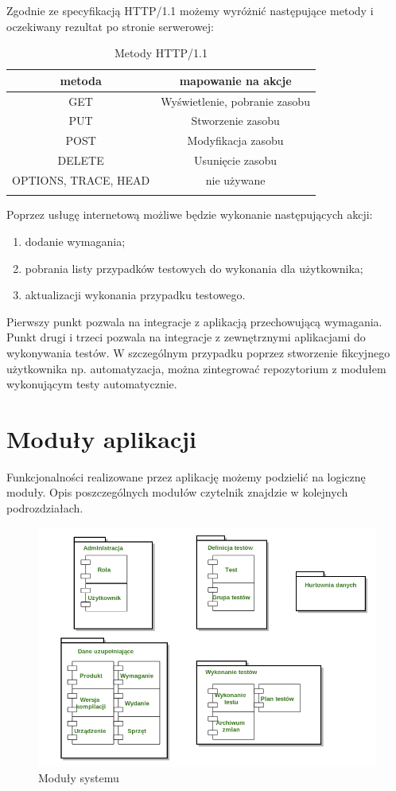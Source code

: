 Zgodnie ze specyfikacją HTTP/1.1 możemy wyróżnić następujące metody i oczekiwany rezultat po stronie serwerowej:

\renewcommand\multirowsetup{\centering\arraybackslash}
\begin{longtable}{|c|c|}
\hline
\textbf{metoda} & \textbf{mapowanie na akcje} \\ \hline
GET & Wyświetlenie, pobranie zasobu \\ \hline
PUT & Stworzenie zasobu \\ \hline
POST & Modyfikacja zasobu \\ \hline
DELETE & Usunięcie zasobu \\ \hline
OPTIONS, TRACE, HEAD & nie używane \\ \hline

\caption{Metody HTTP/1.1 \cite{http}}
\end{longtable}

Poprzez usługę internetową możliwe będzie wykonanie następujących akcji:
\begin{enumerate}
  \item dodanie wymagania;
  \item pobrania listy przypadków testowych do wykonania dla użytkownika;
  \item aktualizacji wykonania przypadku testowego.
\end{enumerate}
Pierwszy punkt pozwala na integracje z aplikacją przechowującą wymagania. Punkt drugi i trzeci pozwala na integracje z zewnętrznymi aplikacjami do wykonywania testów. W szczególnym przypadku poprzez stworzenie fikcyjnego użytkownika np. automatyzacja, można zintegrować repozytorium z modułem wykonującym testy automatycznie.


\section{Moduły aplikacji}
Funkcjonalności realizowane przez aplikację możemy podzielić na logicznę moduły. Opis poszczególnych modułów czytelnik znajdzie w kolejnych podrozdziałach.
\begin{figure}[h]
\centerline{\includegraphics[scale=0.5]{img/komponenty.png}}
\caption{Moduły systemu}
\label{fig:moduly}
\end{figure}

